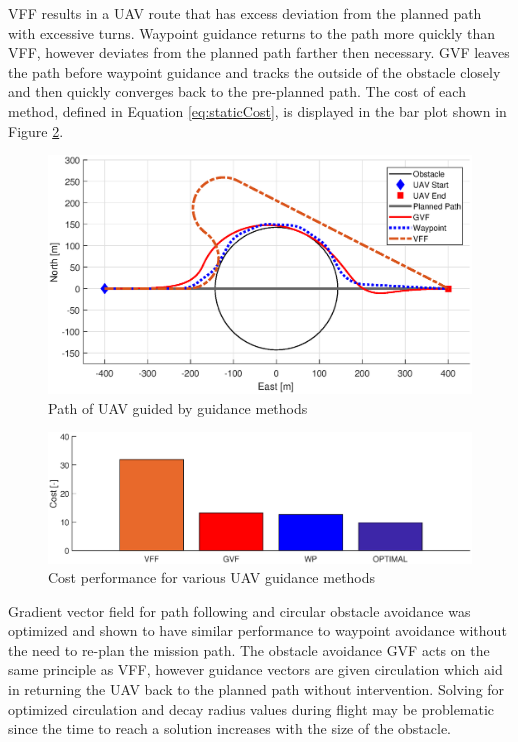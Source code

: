 \documentclass[numbered,pdftex]{ohio-etd}
\begin{document}
VFF results in a UAV route that has excess deviation from the planned path with excessive turns. Waypoint guidance returns to the path more quickly than VFF, however deviates from the planned path farther then necessary. GVF leaves the path before waypoint guidance and tracks the outside of the obstacle closely and then quickly converges back to the pre-planned path. The cost of each method, defined in Equation \ref{eq:staticCost}, is displayed in the bar plot shown in Figure \ref{fig:barplotperformance}.


\begin{figure}[H]
	\centering
	\includegraphics[trim=0 50 0 65,clip,width=15cm]{Figures/Simulations/compareMethods}
	\caption{Path of UAV guided by guidance methods}
	\label{fig:comparemethods}
\end{figure}


\begin{figure}[H]
	\centering
	\label{fig:barPlotCost}
	\includegraphics[width=15cm]{Figures/Simulations/barPlotPerformance}
	\caption{Cost performance for various UAV guidance methods}
	\label{fig:barplotperformance}
\end{figure}

Gradient vector field for path following and circular obstacle avoidance was optimized and shown to have similar performance to waypoint avoidance without the need to re-plan the mission path. The obstacle avoidance GVF acts on the same principle as VFF, however guidance vectors are given circulation which aid in returning the UAV back to the planned path without intervention. Solving for optimized circulation and decay radius values during flight may be problematic since the time to reach a solution increases with the size of the obstacle.
\end{document}
